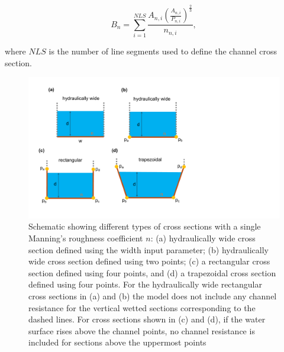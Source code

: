 \documentclass[fleqn]{article}
\begin{document}
\begin{equation}
  B_n = \sum_{i=1}^{NLS} \frac{A_{n,i} \left ( \frac {A_{n,i}}{P_{n,i}}\right )^{\frac{2}{3}}}{n_{n,i}},
\end{equation}

\noindent where $NLS$ is the number of line segments used to define the channel cross section.

\begin{figure}[h!tbp]
	\centering
	\includegraphics[scale=0.5]{figures/cxs.pdf}
	\caption[Schematic showing different types of channel cross sections with constant roughness.]{Schematic showing different types of cross sections with a single Manning's roughness coefficient $n$: (a) hydraulically wide cross section defined using the width input parameter; (b) hydraulically wide cross section defined using two points; (c) a rectangular cross section defined using four points, and (d) a trapezoidal cross section defined using four points.  For the hydraulically wide rectangular cross sections in (a) and (b) the model does not include any channel resistance for the vertical wetted sections corresponding to the dashed lines.  For cross sections shown in (c) and (d), if the water surface rises above the channel points, no channel resistance is included for sections above the uppermost points}
	\label{fig:cxs}
\end{figure}
\end{document}
